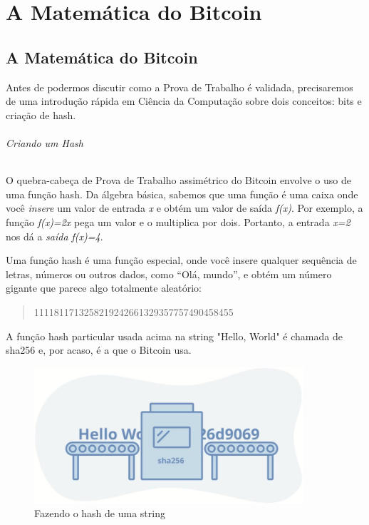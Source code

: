 \part{A Matemática do Bitcoin}
\label{ch:capitulo4}
\chapter*{A Matemática do Bitcoin}

Antes de podermos discutir como a Prova de Trabalho é validada, precisaremos de uma introdução rápida em Ciência da Computação sobre dois conceitos: bits e criação de hash.

\paragraph{Criando um Hash}
\paragraph{}

O quebra-cabeça de Prova de Trabalho assimétrico do Bitcoin envolve o uso de uma função hash. Da álgebra básica, sabemos que uma função é uma caixa onde você \textit{insere} um valor de entrada \textit{x} e obtém um valor de saída \textit{f(x)}. Por exemplo, a função \textit{f(x)=2x} pega um valor e o multiplica por dois. Portanto, a entrada \textit{x=2} nos dá a \textit{saída f(x)=4}.

Uma função hash é uma função especial, onde você insere qualquer sequência de letras, números ou outros dados, como “Olá, mundo”, e obtém um número gigante que parece algo totalmente aleatório:

\begin{quote}{1111811713258219242661329357757490458455 
}\end{quote}

A função hash particular usada acima na string "Hello, World" é chamada de sha256 e, por acaso, é a que o Bitcoin usa.

\begin{figure}
  \centering
  \includegraphics[width=10cm]{imagens/hash-capitulo-04.jpg}
  \caption{Fazendo o hash de uma string}
\end{figure}

